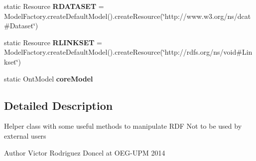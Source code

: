\begin{DoxyCompactItemize}
\item 
\hypertarget{classodrlmodel_1_1_r_d_f_utils_ae28d333f5d0a645ae3a31d521f04c714}{static Resource {\bfseries R\-D\-A\-T\-A\-S\-E\-T} = Model\-Factory.\-create\-Default\-Model().create\-Resource(\char`\"{}http\-://www.\-w3.\-org/ns/dcat\#Dataset\char`\"{})}\label{classodrlmodel_1_1_r_d_f_utils_ae28d333f5d0a645ae3a31d521f04c714}

\item 
\hypertarget{classodrlmodel_1_1_r_d_f_utils_a1a349f4ab087c24143ae7ae0d289f43a}{static Resource {\bfseries R\-L\-I\-N\-K\-S\-E\-T} = Model\-Factory.\-create\-Default\-Model().create\-Resource(\char`\"{}http\-://rdfs.\-org/ns/void\#Linkset\char`\"{})}\label{classodrlmodel_1_1_r_d_f_utils_a1a349f4ab087c24143ae7ae0d289f43a}

\item 
\hypertarget{classodrlmodel_1_1_r_d_f_utils_a0a64cecf84e2bbf86a7736b065a93ec2}{static Ont\-Model {\bfseries core\-Model}}\label{classodrlmodel_1_1_r_d_f_utils_a0a64cecf84e2bbf86a7736b065a93ec2}

\end{DoxyCompactItemize}


\subsection{Detailed Description}
Helper class with some useful methods to manipulate R\-D\-F Not to be used by external users  \begin{DoxyAuthor}{Author}
Victor Rodriguez Doncel at O\-E\-G-\/\-U\-P\-M 2014 
\end{DoxyAuthor}



